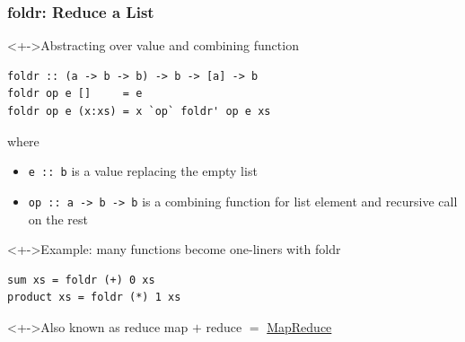 \documentclass{beamer}
\begin{document}
\begin{frame}[fragile]
  \frametitle{foldr: Reduce a List }
  \begin{block}<+->{Abstracting over value and combining function}
\begin{lstlisting}
foldr :: (a -> b -> b) -> b -> [a] -> b
foldr op e []     = e
foldr op e (x:xs) = x `op` foldr' op e xs
\end{lstlisting}
    where
    \begin{itemize}
    \item \texttt{e :: b} is a value replacing the empty list
    \item \texttt{op :: a -> b -> b} is a combining function for list
      element and recursive call on the rest
    \end{itemize}
  \end{block}
  \begin{exampleblock}<+->{Example: many functions become one-liners with foldr}
\begin{lstlisting}
sum xs = foldr (+) 0 xs
product xs = foldr (*) 1 xs
\end{lstlisting}
  \end{exampleblock}
  \begin{alertblock}<+->{Also known as reduce}
    map $+$ reduce $=$ \href{https://en.wikipedia.org/wiki/MapReduce}{MapReduce}
  \end{alertblock}
\end{frame}
\end{document}
